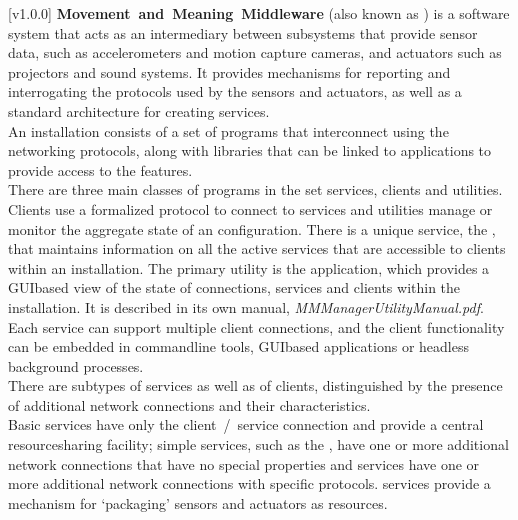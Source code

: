 [v1.0.0]
\textbf{Movement~and~Meaning~Middleware} (also known as \mplusm) is a software system
that acts as an intermediary between subsystems that provide sensor data, such as
accelerometers and motion capture cameras, and actuators such as projectors and sound
systems.
It provides mechanisms for reporting and interrogating the protocols used by the sensors
and actuators, as well as a standard architecture for creating services.\\

An \mplusm{} installation consists of a set of programs that interconnect using the
 networking
protocols, along with libraries that can be linked to applications to provide access to
the \mplusm{} features.\\

There are three main classes of programs in the set \longDash{} services, clients and
utilities.
Clients use a formalized protocol to connect to services and utilities manage or monitor
the aggregate state of an \mplusm{} configuration.
There is a unique service, the , that maintains
information on all the active services that are accessible to clients within an \mplusm{}
installation.
The primary utility is the \emph{\MMMU} application, which provides a GUI\longDash{}based
view of the state of connections, services and clients within the installation.
It is described in its own manual, \emph{MMManagerUtility\fUS{}Manual.pdf}.\\

Each service can support multiple client connections, and the client functionality can be
embedded in command\longDash{}line tools, GUI\longDash{}based applications or headless
background processes.\\

There are subtypes of services as well as of clients, distinguished by the presence of
additional \yarp{} network connections and their characteristics.\\

Basic services have only the client~/~service \yarp{} connection and provide a central
resource\longDash{}sharing facility; simple services, such as the
, have one or more additional \yarp{} network
connections that have no special properties and  services have one or more
additional \yarp{} network connections with specific protocols.
 services provide a mechanism for `packaging' sensors and actuators as
\mplusm{} resources.\\

